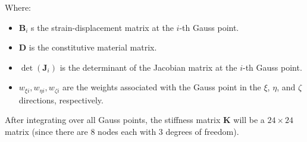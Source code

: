 \documentclass{article}
\begin{document}
Where:
\begin{itemize}
    \item $ \mathbf{B}_i $ s the strain-displacement matrix at the $ i $-th Gauss point.
    \item $ \mathbf{D} $ is the constitutive material matrix.
    \item $ \det(\mathbf{J}_i) $ is the determinant of the Jacobian matrix at the $ i $-th Gauss point.
    \item $ w_{\xi i}, w_{\eta i}, w_{\zeta i} $ are the weights associated with the Gauss point in the $ \xi $, $ \eta $, and $ \zeta $ directions, respectively.
\end{itemize}

After integrating over all Gauss points, the stiffness matrix $ \mathbf{K} $ will be a $ 24 \times 24 $ matrix (since there are 8 nodes each with 3 degrees of freedom).
\end{document}
